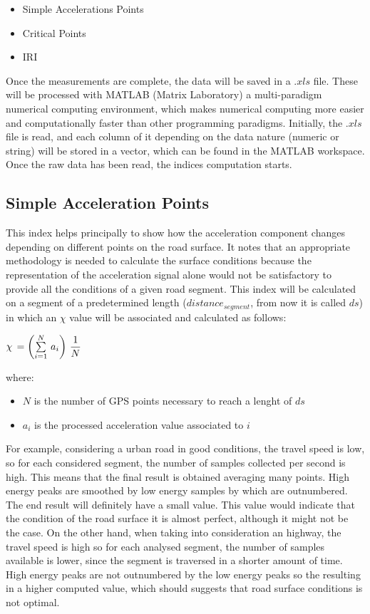\documentclass[tesi]{subfiles}
\begin{document}
 \begin{itemize}
 \item Simple Accelerations Points
 \item Critical Points
 \item IRI
 \end{itemize}
 
Once the measurements are complete, the data will be saved in a $.xls$ file.
These will be processed with MATLAB (Matrix Laboratory) a multi-paradigm numerical computing environment, which makes numerical computing more easier and computationally faster than other programming paradigms.
Initially, the $.xls$ file is read, and each column of it depending on the data nature (numeric or string) will be stored in a vector, which can be found in the MATLAB workspace.
Once the raw data has been read, the indices computation starts.


\subsection{Simple Acceleration Points}\label{ssc:Simple Accelerations Points}
This index helps principally to show how the acceleration component changes depending on different points on the road surface.
It notes that an appropriate methodology is needed to calculate the surface conditions because the representation of the acceleration signal alone would not be satisfactory to provide all the conditions of a given road segment. This index will be calculated on a segment of a predetermined length ($distance_{segment}$, from now it is called $ds$) in which an $\chi$ value will be associated and calculated as follows:

\begin{center}
 $\chi \thinspace = \left( \sum \limits_{i=1}^{N} \thinspace a_{i} \right) \thinspace \dfrac{1}{N}$
\end{center}\label{eq:sap}
where:
\begin{itemize}
\item $N$ is the number of GPS points necessary to reach a lenght of $ds$
\item $a_{i}$ is the processed acceleration value associated to $i$
\end{itemize}

For example, considering a urban road in good conditions, the travel speed is low, so for each considered segment, the number of samples collected per second is high.
This means that the final result is obtained averaging many points.
High energy peaks are smoothed by low energy samples by which are outnumbered.
The end result will definitely have a small value.
This value would indicate that the condition of the road surface it is almost perfect, although it might not be the case.
On the other hand, when taking into consideration an highway, the travel speed is  high so for each analysed segment, the number of samples available is lower, since the segment is traversed in a shorter amount of time.
High energy peaks are not outnumbered by the low energy peaks so the resulting in a higher computed value, which should suggests that road surface conditions is not optimal.
\end{document}
